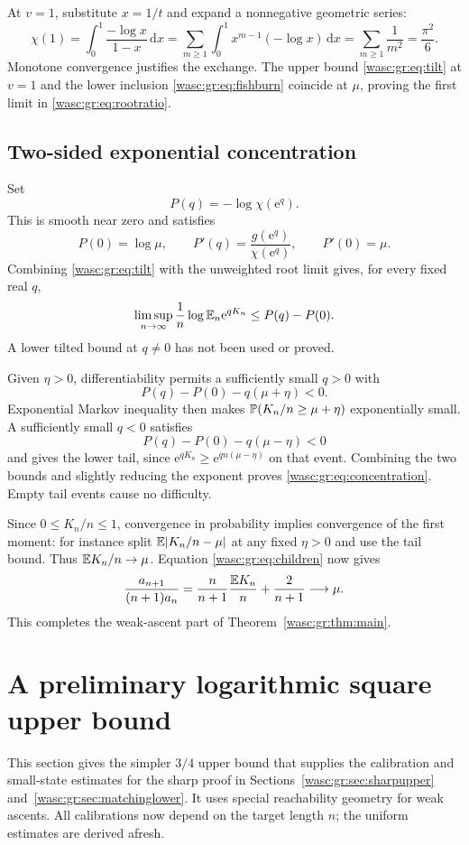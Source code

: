 \documentclass[11pt,a4paper]{article}
\theoremstyle{remark}\newtheorem{remark}[theorem]{Remark}
\newcommand{\dd}{\,\mathrm d}\newcommand{\ee}{\mathrm e}\newcommand{\Wc}{\mathcal W}
\numberwithin{equation}{section}
\begin{document}
At $v=1$, substitute $x=1/t$ and expand a nonnegative geometric series:
\begin{equation}\label{wasc:gr:eq:constant}
\chi(1)=\int_0^1\frac{-\log x}{1-x}\dd x
=\sum_{m\ge1}\int_0^1x^{m-1}(-\log x)\dd x
=\sum_{m\ge1}\frac1{m^2}=\frac{\pi^2}{6}.
\end{equation}
Monotone convergence justifies the exchange. The upper bound \eqref{wasc:gr:eq:tilt} at $v=1$ and the lower inclusion \eqref{wasc:gr:eq:fishburn} coincide at $\mu$, proving the first limit in \eqref{wasc:gr:eq:rootratio}.

\subsection{Two-sided exponential concentration}
Set
\[
P(q)=-\log\chi(\ee^q).
\]
This is smooth near zero and satisfies
\begin{equation}\label{wasc:gr:eq:pressurederivative}
P(0)=\log\mu,\qquad
P'(q)=\frac{g(\ee^q)}{\chi(\ee^q)},\qquad P'(0)=\mu.
\end{equation}
Combining \eqref{wasc:gr:eq:tilt} with the unweighted root limit gives, for every fixed real $q$,
\begin{equation}\label{wasc:gr:eq:mgfupper}
\limsup_{n\to\infty}\frac1n\log\E_n\ee^{qK_n}
\le P(q)-P(0).
\end{equation}
A lower tilted bound at $q\ne0$ has not been used or proved.

Given $\eta>0$, differentiability permits a sufficiently small $q>0$ with
\[
P(q)-P(0)-q(\mu+\eta)<0.
\]
Exponential Markov inequality then makes $\mathbb P(K_n/n\ge\mu+\eta)$ exponentially small. A sufficiently small $q<0$ satisfies
\[
P(q)-P(0)-q(\mu-\eta)<0
\]
and gives the lower tail, since $\ee^{qK_n}\ge\ee^{qn(\mu-\eta)}$ on that event. Combining the two bounds and slightly reducing the exponent proves \eqref{wasc:gr:eq:concentration}. Empty tail events cause no difficulty.

Since $0\le K_n/n\le1$, convergence in probability implies convergence of the first moment: for instance split $\mathbb E|K_n/n-\mu|$ at any fixed $\eta>0$ and use the tail bound. Thus $\mathbb E K_n/n\to\mu$. Equation \eqref{wasc:gr:eq:children} now gives
\[
\frac{a_{n+1}}{(n+1)a_n}=
\frac{n}{n+1}\frac{\mathbb E K_n}{n}+\frac2{n+1}\longrightarrow\mu.
\]
This completes the weak-ascent part of Theorem~\ref{wasc:gr:thm:main}.

\section{A preliminary logarithmic square upper bound}\label{wasc:gr:sec:logsquare}
This section gives the simpler $3/4$ upper bound that supplies the calibration and small-state estimates for the sharp proof in Sections~\ref{wasc:gr:sec:sharpupper} and~\ref{wasc:gr:sec:matchinglower}. It uses special reachability geometry for weak ascents. All calibrations now depend on the target length $n$; the uniform estimates are derived afresh.
\end{document}
